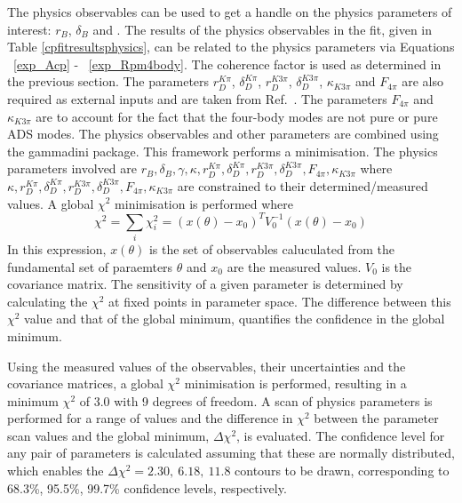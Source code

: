 The physics observables can be used to get a handle on the physics parameters of interest: $r_B$, $\delta_B$ and \Pgamma. 
The results of the physics observables in the \CP fit, given in Table \ref{cpfitresultsphysics}, can be related to the physics parameters via Equations ~\ref{exp_Acp} - ~\ref{exp_Rpm4body}. The coherence factor is used as determined in the previous section. The parameters $r_D^{K\pi}$, $\delta_D^{K\pi}$, $r_D^{K3\pi}$, $\delta_D^{K3\pi}$, $\kappa_{K3\pi}$ and $F_{4\pi}$ are also required as external inputs and are taken from Ref.~\cite{HFAG,charmk3pi,LHCb-PAPER-2015-057,charm4pi}. The parameters $F_{4\pi}$ and $\kappa_{K3\pi}$ are to account for the fact that the four-body modes are not pure \CP or pure ADS modes. The physics observables and other parameters are combined using the gammadini package. This framework performs a minimisation. The physics parameters involved are $r_B, \delta_B, \gamma, \kappa, r_D^{K\pi}, \delta_D^{K\pi}, r_D^{K3\pi}, \delta_D^{K3\pi}, F_{4\pi}, \kappa_{K3\pi}$ where $\kappa, r_D^{K\pi}, \delta_D^{K\pi}, r_D^{K3\pi}, \delta_D^{K3\pi}, F_{4\pi}, \kappa_{K3\pi}$ are constrained to their determined/measured values. 
A global $\chi^2$ minimisation is performed where
\begin{equation}
\chi^2 = \sum_i \chi^2_i = (x(\theta) - x_0)^TV_0^{-1}(x(\theta)-x_0)
\end{equation}
In this expression, $x(\theta)$ is the set of observables caluculated from the fundamental set of paraemters $\theta$ and $x_0$ are the measured values. $V_0$ is the covariance matrix.
The sensitivity of a given parameter is determined by calculating the $\chi^2$ at fixed points in parameter space. The difference between this $\chi^2$ value and that of the global minimum, quantifies the confidence in the global minimum. 

Using the measured values of the \CP observables, their uncertainties and the covariance matrices, a global $\chi^2$ minimisation is performed, resulting in a minimum $\chi^2$ of 3.0 with 9 degrees of freedom. A scan of physics parameters is performed for a range of values and the difference in $\chi^2$ between the parameter scan values and the global minimum, $\Delta\chi^2$, is evaluated. The confidence level for any pair of parameters is calculated assuming that these are normally distributed, which enables the $\Delta \chi^2 = 2.30,\ 6.18,\ 11.8$ contours to be drawn, corresponding to 68.3\%, 95.5\%, 99.7\% confidence levels, respectively. 

